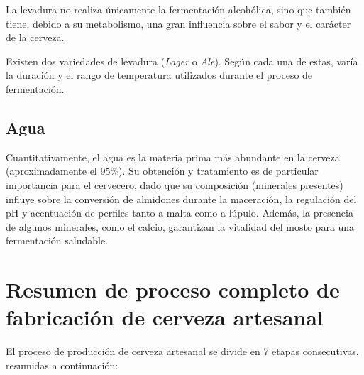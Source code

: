             \par La levadura no realiza únicamente la fermentación alcohólica, sino que también tiene, debido a su metabolismo, una gran influencia sobre el sabor y el carácter de la cerveza.
            
            \par Existen dos variedades de levadura (\textit{Lager} o \textit{Ale}). Según cada una de estas, varía la duración y el rango de temperatura utilizados durante el proceso de fermentación.
            
        \subsection{Agua}
            \par Cuantitativamente, el agua es la materia prima más abundante en la cerveza (aproximadamente el 95\%). Su obtención y tratamiento es de particular importancia para el cervecero, dado que su composición (minerales presentes) influye sobre la conversión de almidones durante la maceración, la regulación del pH y acentuación de perfiles tanto a malta como a lúpulo. Además, la presencia de algunos minerales, como el calcio, garantizan la vitalidad del mosto para una fermentación saludable.
            
    \section{Resumen de proceso completo de fabricación de cerveza artesanal}
        \par El proceso de producción de cerveza artesanal se divide en 7 etapas consecutivas, resumidas a continuación:
        
